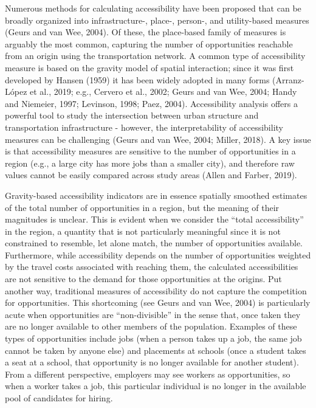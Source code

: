 \documentclass[]{elsarticle} %
\begin{document}
Numerous methods for calculating accessibility have been proposed that
can be broadly organized into infrastructure-, place-, person-, and
utility-based measures (Geurs and van Wee, 2004). Of these, the
place-based family of measures is arguably the most common, capturing
the number of opportunities reachable from an origin using the
transportation network. A common type of accessibility measure is based
on the gravity model of spatial interaction; since it was first
developed by Hansen (1959) it has been widely adopted in many forms
(Arranz-López et al., 2019; e.g., Cervero et al., 2002; Geurs and van
Wee, 2004; Handy and Niemeier, 1997; Levinson, 1998; Paez, 2004).
Accessibility analysis offers a powerful tool to study the intersection
between urban structure and transportation infrastructure - however, the
interpretability of accessibility measures can be challenging (Geurs and
van Wee, 2004; Miller, 2018). A key issue is that accessibility measures
are sensitive to the number of opportunities in a region (e.g., a large
city has more jobs than a smaller city), and therefore raw values cannot
be easily compared across study areas (Allen and Farber, 2019).

Gravity-based accessibility indicators are in essence spatially smoothed
estimates of the total number of opportunities in a region, but the
meaning of their magnitudes is unclear. This is evident when we consider
the ``total accessibility'' in the region, a quantity that is not
particularly meaningful since it is not constrained to resemble, let
alone match, the number of opportunities available. Furthermore, while
accessibility depends on the number of opportunities weighted by the
travel costs associated with reaching them, the calculated
accessibilities are not sensitive to the demand for those opportunities
at the origins. Put another way, traditional measures of accessibility
do not capture the competition for opportunities. This shortcoming (see
Geurs and van Wee, 2004) is particularly acute when opportunities are
``non-divisible'' in the sense that, once taken they are no longer
available to other members of the population. Examples of these types of
opportunities include jobs (when a person takes up a job, the same job
cannot be taken by anyone else) and placements at schools (once a
student takes a seat at a school, that opportunity is no longer
available for another student). From a different perspective, employers
may see workers as opportunities, so when a worker takes a job, this
particular individual is no longer in the available pool of candidates
for hiring.
\end{document}
